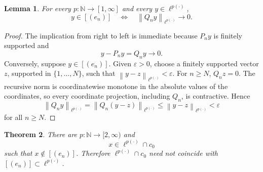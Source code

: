 \documentclass[11pt]{amsart}
\newtheorem{theorem}{Theorem}
\newtheorem{lemma}[theorem]{Lemma}
\newcommand{\N}{\mathbb N}
\newcommand{\norm}[1]{\left\|#1\right\|}
\begin{document}
\begin{lemma}\label{lem:tail-characterization}
For every \(p:\N\to[1,\infty]\) and every \(y\in\ell^{p(\cdot)}\),
\[
  y\in[(e_n)] \quad\Longleftrightarrow\quad
  \norm{Q_ny}_{\ell^{p(\cdot)}}\to0.
\]
\end{lemma}

\begin{proof}
The implication from right to left is immediate because \(P_ny\) is finitely
supported and
\[
  y-P_ny=Q_ny\to0.
\]
Conversely, suppose \(y\in[(e_n)]\).  Given \(\varepsilon>0\), choose a
finitely supported vector \(z\), supported in \(\{1,\ldots,N\}\), such that
\(\norm{y-z}_{\ell^{p(\cdot)}}<\varepsilon\).  For \(n\ge N\), \(Q_nz=0\).
The recursive norm is coordinatewise monotone in the absolute values of the
coordinates, so every coordinate projection, including \(Q_n\), is
contractive.  Hence
\[
  \norm{Q_ny}_{\ell^{p(\cdot)}}=\norm{Q_n(y-z)}_{\ell^{p(\cdot)}}
  \le \norm{y-z}_{\ell^{p(\cdot)}}<\varepsilon
\]
for all \(n\ge N\).
\end{proof}

\begin{theorem}\label{thm:counterexample}
There are \(p:\N\to[2,\infty)\) and
\[
  x\in \ell^{p(\cdot)}\cap c_0
\]
such that \(x\notin[(e_n)]\).  Therefore
\(\ell^{p(\cdot)}\cap c_0\) need not coincide with
\([(e_n)]\subset\ell^{p(\cdot)}\).
\end{theorem}
\end{document}
